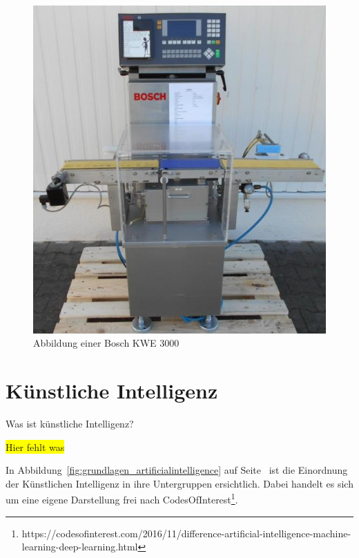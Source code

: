\begin{figure}[h]
    \centering
    \includegraphics[scale=0.3]{images/kapitel_2/bosch_kwe.jpg}
    \caption{Abbildung einer Bosch KWE 3000}
    \label{fig:grundlagen_boschkwe}
\end{figure}

\section{Künstliche Intelligenz}
Was ist künstliche Intelligenz?

\colorbox{yellow}{Hier fehlt was}

In Abbildung~\ref{fig:grundlagen_artificialintelligence} auf Seite~\pageref{fig:grundlagen_artificialintelligence} ist
die Einordnung der Künstlichen Intelligenz in ihre Untergruppen ersichtlich. Dabei handelt es sich um eine eigene
Darstellung frei nach CodesOfInterest\footnote{https://codesofinterest.com/2016/11/difference-artificial-intelligence-machine-learning-deep-learning.html}.

